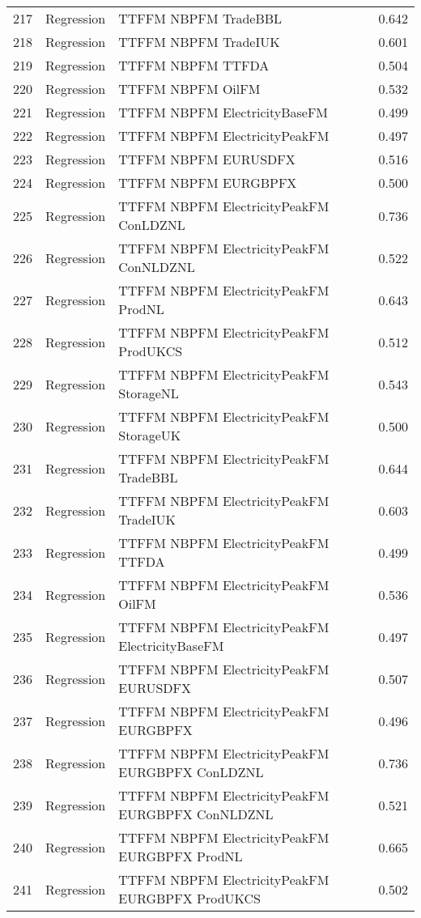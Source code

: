 \begin{table}[ht]
\begin{tabular}{rllr}
  217 & Regression & TTFFM NBPFM TradeBBL & 0.642 \\ 
  218 & Regression & TTFFM NBPFM TradeIUK & 0.601 \\ 
  219 & Regression & TTFFM NBPFM TTFDA & 0.504 \\ 
  220 & Regression & TTFFM NBPFM OilFM & 0.532 \\ 
  221 & Regression & TTFFM NBPFM ElectricityBaseFM & 0.499 \\ 
  222 & Regression & TTFFM NBPFM ElectricityPeakFM & 0.497 \\ 
  223 & Regression & TTFFM NBPFM EURUSDFX & 0.516 \\ 
  224 & Regression & TTFFM NBPFM EURGBPFX & 0.500 \\ 
  225 & Regression & TTFFM NBPFM ElectricityPeakFM ConLDZNL & 0.736 \\ 
  226 & Regression & TTFFM NBPFM ElectricityPeakFM ConNLDZNL & 0.522 \\ 
  227 & Regression & TTFFM NBPFM ElectricityPeakFM ProdNL & 0.643 \\ 
  228 & Regression & TTFFM NBPFM ElectricityPeakFM ProdUKCS & 0.512 \\ 
  229 & Regression & TTFFM NBPFM ElectricityPeakFM StorageNL & 0.543 \\ 
  230 & Regression & TTFFM NBPFM ElectricityPeakFM StorageUK & 0.500 \\ 
  231 & Regression & TTFFM NBPFM ElectricityPeakFM TradeBBL & 0.644 \\ 
  232 & Regression & TTFFM NBPFM ElectricityPeakFM TradeIUK & 0.603 \\ 
  233 & Regression & TTFFM NBPFM ElectricityPeakFM TTFDA & 0.499 \\ 
  234 & Regression & TTFFM NBPFM ElectricityPeakFM OilFM & 0.536 \\ 
  235 & Regression & TTFFM NBPFM ElectricityPeakFM ElectricityBaseFM & 0.497 \\ 
  236 & Regression & TTFFM NBPFM ElectricityPeakFM EURUSDFX & 0.507 \\ 
  237 & Regression & TTFFM NBPFM ElectricityPeakFM EURGBPFX & 0.496 \\ 
  238 & Regression & TTFFM NBPFM ElectricityPeakFM EURGBPFX ConLDZNL & 0.736 \\ 
  239 & Regression & TTFFM NBPFM ElectricityPeakFM EURGBPFX ConNLDZNL & 0.521 \\ 
  240 & Regression & TTFFM NBPFM ElectricityPeakFM EURGBPFX ProdNL & 0.665 \\ 
  241 & Regression & TTFFM NBPFM ElectricityPeakFM EURGBPFX ProdUKCS & 0.502 \\ 

\end{tabular}
\end{table}
